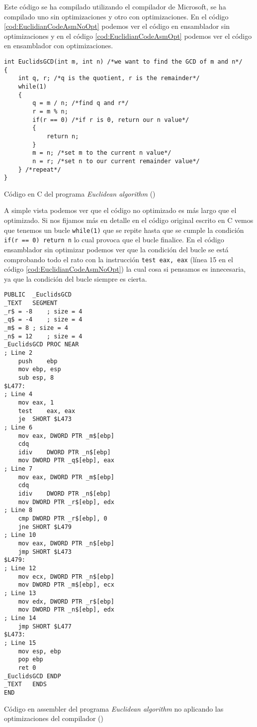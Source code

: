 Este código se ha compilado utilizando el compilador de Microsoft, se ha compilado uno sin optimizaciones
y otro con optimizaciones. En el código \ref{cod:EuclidianCodeAsmNoOpt} podemos ver el código
en ensamblador sin optimizaciones y en el código \ref{cod:EuclidianCodeAsmOpt} podemos ver
el código en ensamblador con optimizaciones.

\newpage
\begin{mycode}
    \begin{verbatim}
int EuclidsGCD(int m, int n) /*we want to find the GCD of m and n*/
{
    int q, r; /*q is the quotient, r is the remainder*/
    while(1)
    {
        q = m / n; /*find q and r*/
        r = m % n;
        if(r == 0) /*if r is 0, return our n value*/
        {
            return n;
        }
        m = n; /*set m to the current n value*/
        n = r; /*set n to our current remainder value*/
    } /*repeat*/
}
    \end{verbatim}
    \caption[Código en C del programa \textit{Euclidean algorithm}]{Código en C del programa \textit{Euclidean algorithm} (\cite{EuclidianCode})}
    \label{cod:EuclidianCode}
\end{mycode}

A simple vista podemos ver que el código no optimizado es más largo que el optimizado. Si nos
fijamos más en detalle en el código original escrito en C vemos que tenemos un bucle \texttt{while(1)}
que se repite hasta que se cumple la condición \texttt{if(r == 0) return n} lo cual
provoca que el bucle finalice. En el código ensamblador sin optimizar podemos ver que la condición
del bucle se está comprobando todo el rato con la instrucción \texttt{test eax, eax}
(línea 15 en el código \ref{cod:EuclidianCodeAsmNoOpt}) la cual cosa si pensamos es innecesaria, ya
que la condición del bucle siempre es cierta.

\begin{mycode}
    \begin{verbatim}
PUBLIC	_EuclidsGCD
_TEXT	SEGMENT
_r$ = -8	; size = 4
_q$ = -4	; size = 4
_m$ = 8	; size = 4
_n$ = 12	; size = 4
_EuclidsGCD PROC NEAR
; Line 2
    push	ebp
    mov	ebp, esp
    sub	esp, 8
$L477:
; Line 4
    mov	eax, 1
    test	eax, eax
    je	SHORT $L473
; Line 6
    mov	eax, DWORD PTR _m$[ebp]
    cdq
    idiv	DWORD PTR _n$[ebp]
    mov	DWORD PTR _q$[ebp], eax
; Line 7
    mov	eax, DWORD PTR _m$[ebp]
    cdq
    idiv	DWORD PTR _n$[ebp]
    mov	DWORD PTR _r$[ebp], edx
; Line 8
    cmp	DWORD PTR _r$[ebp], 0
    jne	SHORT $L479
; Line 10
    mov	eax, DWORD PTR _n$[ebp]
    jmp	SHORT $L473
$L479:
; Line 12
    mov	ecx, DWORD PTR _n$[ebp]
    mov	DWORD PTR _m$[ebp], ecx
; Line 13
    mov	edx, DWORD PTR _r$[ebp]
    mov	DWORD PTR _n$[ebp], edx
; Line 14
    jmp	SHORT $L477
$L473:
; Line 15
    mov	esp, ebp
    pop	ebp
    ret	0
_EuclidsGCD ENDP
_TEXT	ENDS
END
    \end{verbatim}
    \caption[Código en assembler del programa \textit{Euclidean algorithm} no aplicando las optimizaciones del compilador]{Código en assembler del programa \textit{Euclidean algorithm} no aplicando las optimizaciones del compilador (\cite{EuclidianCode})}
    \label{cod:EuclidianCodeAsmNoOpt}
\end{mycode}

